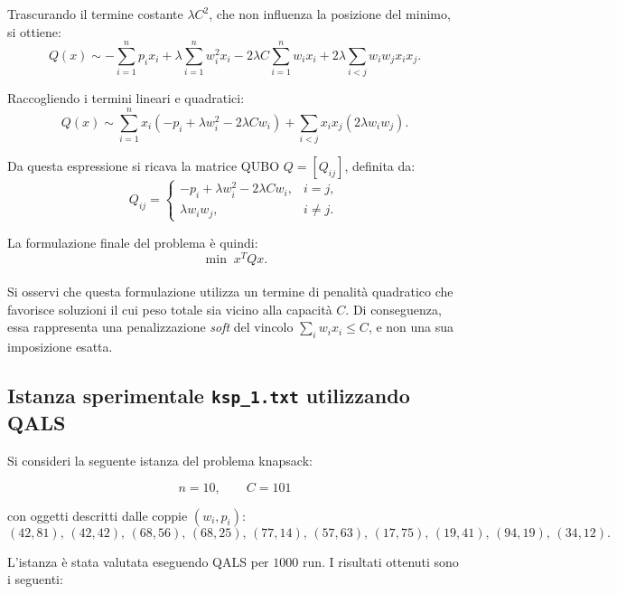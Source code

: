 \documentclass[a4paper,12pt]{article}
\begin{document}
Trascurando il termine costante \(\lambda C^2\), che non influenza la posizione del minimo, si ottiene:
\begin{equation}
Q(x) \sim
-\sum_{i=1}^{n} p_i x_i
+ \lambda \sum_{i=1}^{n} w_i^2 x_i
- 2\lambda C \sum_{i=1}^{n} w_i x_i
+ 2\lambda \sum_{i<j} w_i w_j x_i x_j.
\end{equation}

Raccogliendo i termini lineari e quadratici:
\begin{equation}
Q(x) \sim
\sum_{i=1}^{n} x_i \left(-p_i + \lambda w_i^2 - 2\lambda C w_i \right)
+
\sum_{i<j} x_i x_j \left(2\lambda w_i w_j\right).
\end{equation}

Da questa espressione si ricava la matrice QUBO \(Q = [Q_{ij}]\), definita da:
\begin{equation}
Q_{ij} =
\begin{cases}
-p_i + \lambda w_i^2 - 2\lambda C w_i, & i=j, \\[6pt]
\lambda w_i w_j, & i\neq j.
\end{cases}
\end{equation}

La formulazione finale del problema è quindi:
\begin{equation}
\min \; x^T Q x.
\end{equation}

\paragraph{}
Si osservi che questa formulazione utilizza un termine di penalità quadratico che favorisce soluzioni 
il cui peso totale sia vicino alla capacità \(C\). Di conseguenza, essa rappresenta una penalizzazione 
\emph{soft} del vincolo \(\sum_i w_i x_i \leq C\), e non una sua imposizione esatta.

\subsection*{Istanza sperimentale \texttt{ksp\_1.txt} utilizzando QALS}

Si consideri la seguente istanza del problema knapsack:

\[
n = 10, \qquad C = 101
\]

con oggetti descritti dalle coppie \((w_i, p_i)\):
\[
(42,81),\,
(42,42),\,
(68,56),\,
(68,25),\,
(77,14),\,
(57,63),\,
(17,75),\,
(19,41),\,
(94,19),\,
(34,12).
\]

L'istanza è stata valutata eseguendo QALS per \(1000\) run. I risultati ottenuti sono i seguenti:
\end{document}
